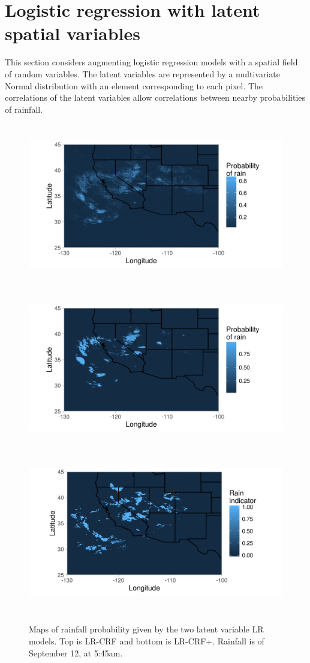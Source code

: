 \section{Logistic regression with latent spatial variables}

This section considers augmenting logistic regression models with a spatial field of random variables. The latent variables are represented by a multivariate Normal distribution with an element corresponding to each pixel. The correlations of the latent variables allow correlations between nearby probabilities of rainfall.

\begin{figure}[t!]
\centering
\includegraphics[height=2.8in]{./R/prec.png}
\includegraphics[height=2.8in]{./R/prec_w.png}
\includegraphics[height=2.8in]{./R/prec_t.png}
\caption{Maps of rainfall probability given by the two latent variable LR models. Top is LR-CRF and bottom is LR-CRF+. Rainfall is of September 12, at 5:45am.}

\label{probprec}
\end{figure}

